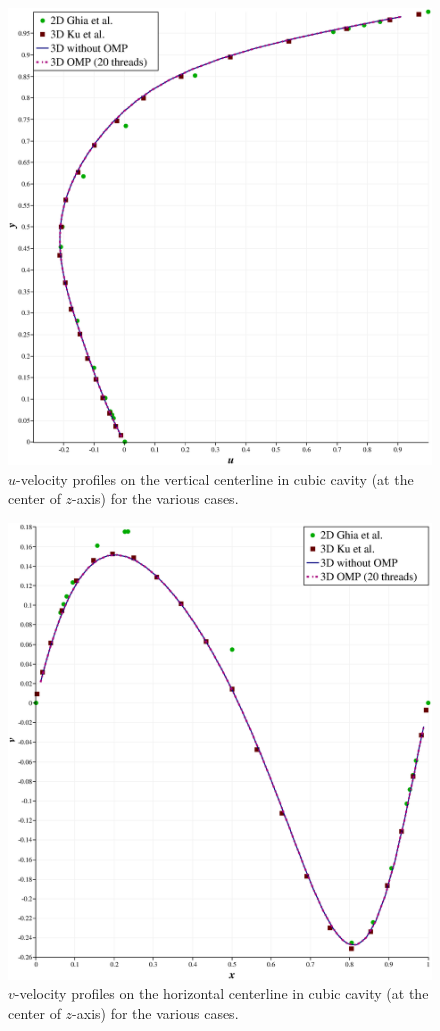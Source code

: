 \documentclass[12pt,a4paper,fleqn]{article}
\begin{document}
\begin{figure}[H]
    \centering
    \includegraphics[width=\linewidth]{U-3D_ompValidation.eps}
    \caption{\(u\)-velocity profiles on the vertical centerline in cubic cavity (at the center of \(z\)-axis) for the various cases.}
\end{figure}

\begin{figure}[H]
    \centering
    \includegraphics[width=\linewidth]{V-3D_ompValidation.eps}
    \caption{\(v\)-velocity profiles on the horizontal centerline in cubic cavity (at the center of \(z\)-axis) for the various cases.}
\end{figure}
\end{document}

